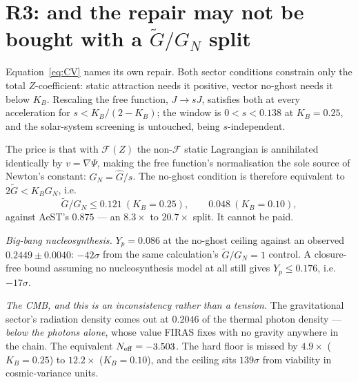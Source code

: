 \documentclass[aps,prd,twocolumn,10pt,nofootinbib,superscriptaddress]{revtex4-2}
\newcommand{\FF}{\mathcal{F}}
\newcommand{\Gt}{\tilde{G}}
\begin{document}
\section{R3: and the repair may not be bought with a $\Gt/G_N$ split}

Equation~\eqref{eq:CV} names its own repair. Both sector conditions constrain only the total
$Z$-coefficient: static attraction needs it positive, vector no-ghost needs it below $K_B$.
Rescaling the free function, $J\to sJ$, satisfies both at every acceleration for
$s<K_B/(2-K_B)$; the window is $0<s<0.138$ at $K_B=0.25$, and the solar-system screening is
untouched, being $s$-independent.

The price is that with $\FF(Z)$ the non-$\FF$ static Lagrangian is annihilated identically by
$v=\nabla\Psi$, making the free function's normalisation the sole source of Newton's constant:
$G_N=\hat G/s$. The no-ghost condition is therefore equivalent to $2\Gt<K_B G_N$, i.e.
\begin{equation}
\Gt/G_N\le0.121\ (K_B=0.25),\qquad 0.048\ (K_B=0.10),
\end{equation}
against AeST's $0.875$ --- an $8.3\times$ to $20.7\times$ split. It cannot be paid.

\emph{Big-bang nucleosynthesis.} $Y_p=0.086$ at the no-ghost ceiling against an observed
$0.2449\pm0.0040$: $-42\sigma$ from the same calculation's $\Gt/G_N=1$ control. A closure-free
bound assuming no nucleosynthesis model at all still gives $Y_p\le0.176$, i.e.\ $-17\sigma$.

\emph{The CMB, and this is an inconsistency rather than a tension.} The gravitational sector's
radiation density comes out at $0.2046$ of the thermal photon density --- \emph{below the photons
alone}, whose value FIRAS \cite{FIRAS} fixes with no gravity anywhere in the chain. The equivalent
$N_{\rm eff}=-3.503$. The hard floor is missed by $4.9\times$ ($K_B=0.25$) to $12.2\times$
($K_B=0.10$), and the ceiling sits $139\sigma$ from viability in cosmic-variance units.
\end{document}
